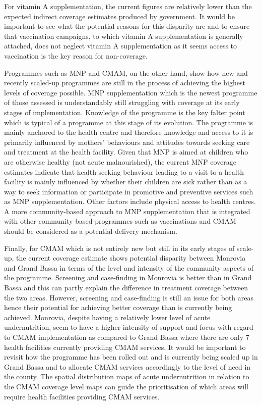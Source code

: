 \documentclass[12pt,a4paper]{article}
\begin{document}
For vitamin A supplementation, the current figures are relatively lower than the expected indirect coverage estimates produced by government. It would be important to see what the potential reasons for this disparity are and to ensure that vaccination campaigns, to which vitamin A supplementation is generally attached, does not neglect vitamin A supplementation as it seems access to vaccination is the key reason for non-coverage.

Programmes such as MNP and CMAM, on the other hand, show how new and recently scaled-up programmes are still in the process of achieving the highest levels of coverage possible. MNP supplementation which is the newest programme of those assessed is understandably still struggling with coverage at its early stages of implementation. Knowledge of the programme is the key falter point which is typical of a programme at this stage of its evolution. The programme is mainly anchored to the health centre and therefore knowledge and access to it is primarily influenced by mothers' behaviours and attitudes towards seeking care and treatment at the health facility. Given that MNP is aimed at children who are otherwise healthy (not acute malnourished), the current MNP coverage estimates indicate that health-seeking behaviour leading to a visit to a health facility is mainly influenced by whether their children are sick rather than as a way to seek information or participate in promotive and preventive services such as MNP supplementation. Other factors include physical access to health centres. A more community-based approach to MNP supplementation that is integrated with other community-based programmes such as vaccinations and CMAM should be considered as a potential delivery mechanism.

Finally, for CMAM which is not entirely new but still in its early stages of scale-up, the current coverage estimate shows potential disparity between Monrovia and Grand Bassa in terms of the level and intensity of the community aspects of the programme. Screening and case-finding in Monrovia is better than in Grand Bassa and this can partly explain the difference in treatment coverage between the two areas. However, screening and case-finding is still an issue for both areas hence their potential for achieving better coverage than is currently being achieved. Monrovia, despite having a relatively lower level of acute undernutrition, seem to have a higher intensity of support and focus with regard to CMAM implementation as compared to Grand Bassa where there are only 7 health facilities currently providing CMAM services. It would be important to revisit how the programme has been rolled out and is currently being scaled up in Grand Bassa and to allocate CMAM services accordingly to the level of need in the county. The spatial distribution maps of acute undernutrition in relation to the CMAM coverage level maps can guide the prioritisation of which areas will require health facilities providing CMAM services.
\end{document}

